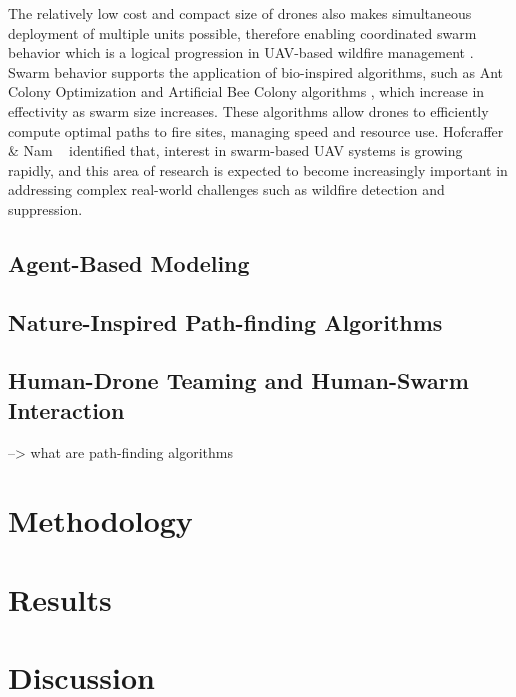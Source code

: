 \documentclass[twoside]{article}
\begin{document}
The relatively low cost and compact size of drones also makes simultaneous deployment of multiple units possible, therefore enabling coordinated swarm behavior which is a logical progression in UAV-based wildfire management \citep{MetaanalysisHumansystemInterfaces}. Swarm behavior supports the application of bio-inspired algorithms, such as Ant Colony Optimization \citep{HybridAntColonyWildfire} and Artificial Bee Colony algorithms \citep{karaboga2007abc}, which increase in effectivity as swarm size increases. These algorithms allow drones to efficiently compute optimal paths to fire sites, managing speed and resource use.
Hofcraffer \& Nam ~\citep{MetaanalysisHumansystemInterfaces} identified that, interest in swarm-based UAV systems is growing rapidly, and this area of research is expected to become increasingly important in addressing complex real-world challenges such as wildfire detection and suppression.



\subsection{Agent-Based Modeling}


\subsection{Nature-Inspired Path-finding Algorithms}


\subsection{Human-Drone Teaming and Human-Swarm Interaction}








--> what are path-finding algorithms
\section{Methodology}
\section{Results}
\section{Discussion}





\end{document}
